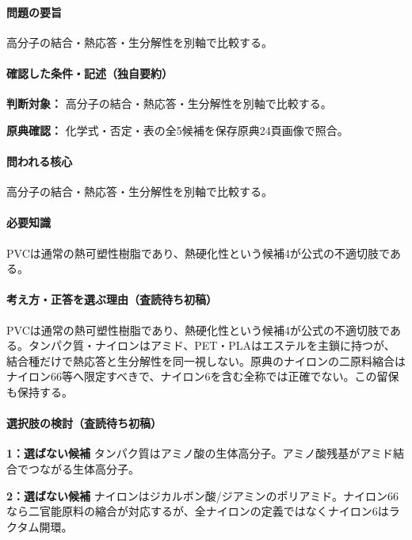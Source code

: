 \paragraph{問題の要旨} 高分子の結合・熱応答・生分解性を別軸で比較する。

\paragraph{確認した条件・記述（独自要約）}\mbox{}\par

\noindent\textbf{判断対象：} 高分子の結合・熱応答・生分解性を別軸で比較する。\par

\noindent\textbf{原典確認：} 化学式・否定・表の全5候補を保存原典24頁画像で照合。\par

\paragraph{問われる核心} 高分子の結合・熱応答・生分解性を別軸で比較する。

\paragraph{必要知識} PVCは通常の熱可塑性樹脂であり、熱硬化性という候補4が公式の不適切肢である。

\paragraph{考え方・正答を選ぶ理由（査読待ち初稿）} PVCは通常の熱可塑性樹脂であり、熱硬化性という候補4が公式の不適切肢である。タンパク質・ナイロンはアミド、PET・PLAはエステルを主鎖に持つが、結合種だけで熱応答と生分解性を同一視しない。原典のナイロンの二原料縮合はナイロン66等へ限定すべきで、ナイロン6を含む全称では正確でない。この留保も保持する。

\paragraph{選択肢の検討（査読待ち初稿）}\mbox{}\par

\noindent\textbf{1：選ばない候補} タンパク質はアミノ酸の生体高分子。アミノ酸残基がアミド結合でつながる生体高分子。\par

\noindent\textbf{2：選ばない候補} ナイロンはジカルボン酸/ジアミンのポリアミド。ナイロン66なら二官能原料の縮合が対応するが、全ナイロンの定義ではなくナイロン6はラクタム開環。\par

